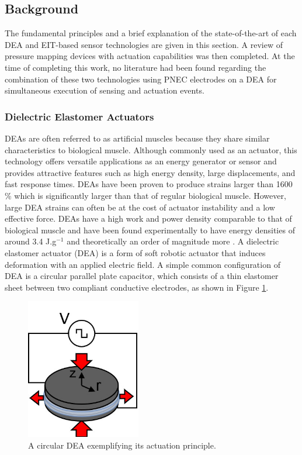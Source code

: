 \subsection{Background} 
\label{subsec:background}
The fundamental principles and a brief explanation of the state-of-the-art of each DEA and EIT-based sensor technologies are given in this section. A review of pressure mapping devices with actuation capabilities was then completed. At the time of completing this work, no literature had been found regarding the combination of these two technologies using PNEC electrodes on a DEA for simultaneous execution of sensing and actuation events.  

\subsubsection{Dielectric Elastomer Actuators}
\label{subsubsec:deas}
DEAs are often referred to as artificial muscles because they share similar characteristics to biological muscle. Although commonly used as an actuator, this technology offers versatile applications as an energy generator \cite{McKnight2002, Carpi2008, Koh2009} or sensor and provides attractive features such as high energy density, large displacements, and fast response times. DEAs have been proven to produce strains larger than 1600 \% \cite{Keplinger2012} which is significantly larger than that of regular biological muscle. However, large DEA strains can often be at the cost of actuator instability and a low effective force. DEAs have a high work and power density comparable to that of biological muscle and have been found experimentally to have energy densities of around 3.4 J.g$^{-1}$ and theoretically an order of magnitude more \cite{Liu2009, Koh2009} . A dielectric elastomer actuator (DEA) is a form of soft robotic actuator that induces deformation with an applied electric field. A simple common configuration of DEA is a circular parallel plate capacitor, which consists of a thin elastomer sheet between two compliant conductive electrodes, as shown in Figure \ref{fig:DEA_diagram}. 
\begin{figure}[H]
	\centering
	\includegraphics[width=5cm]{Figures/circ_DEA_v2.jpg} %
	\vspace{0.2cm}
	\caption{A circular DEA exemplifying its actuation principle.}
	\label{fig:DEA_diagram}
\end{figure}
